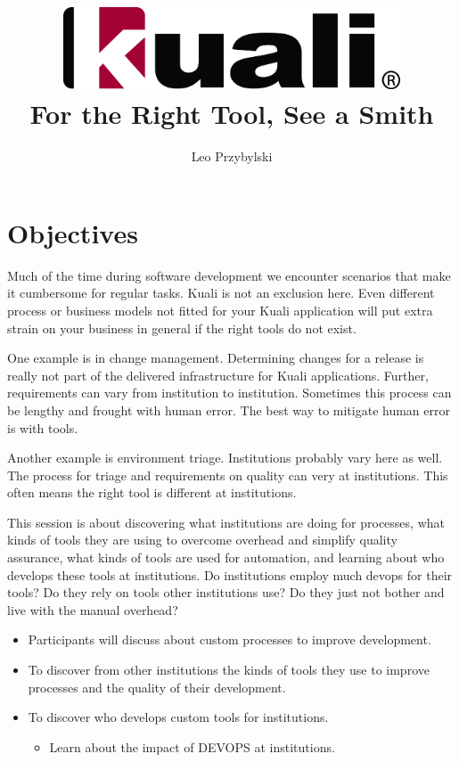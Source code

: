 \documentclass[12pt,notitlepage]{article}
\author{Leo Przybylski}
\title{\includegraphics[width=0.75\textwidth]{kuali_base.png}\\For the Right Tool, See a Smith}
\date{}
\begin{document}
\maketitle
{}

\section{Objectives}

Much of the time during software development we encounter
  scenarios that make it cumbersome for regular tasks. Kuali is not an
exclusion here. Even different process or business models not fitted
for your Kuali application will put extra strain on your business in
general if the right tools do not exist. 

One example is in change
management. Determining changes for a release is really not part of
the delivered infrastructure for Kuali applications. Further, requirements can
vary from institution to institution. Sometimes this process can be
lengthy and frought with human error. The best way to mitigate human
error is with tools.

Another example is environment triage. Institutions probably vary here
as well. The process for triage and requirements on quality can very
at institutions. This often means the right tool is different at
institutions.

This session is about discovering what institutions are doing for
processes, what kinds of tools they are using to overcome overhead and 
simplify quality assurance, what kinds of tools are used for
automation,
 and learning about who develops these
tools at institutions. Do institutions employ much devops for their
tools? Do they rely on tools other institutions use? Do they just not
bother and live with the manual overhead?


\begin{itemize}
\item Participants will discuss about custom processes to improve
  development.
\item To discover from other institutions the kinds of tools they use
  to improve processes and the quality of their development.
\item To discover who develops custom tools for institutions.
  \begin{itemize}
    \item Learn about the impact of DEVOPS at institutions.
  \end{itemize}
\end{itemize}
\end{document}
